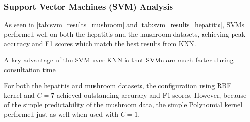 \subsubsection{Support Vector Machines (SVM) Analysis}
\label{subsubsec:discussion-svm}

As seen in \autoref{tab:svm_results_mushroom} and \autoref{tab:svm_results_hepatitis},
SVMs performed well on both the hepatitis and the mushroom datasets,
achieving peak accuracy and F1 scores which match the best results from KNN.

A key advantage of the SVM over KNN is that SVMs are much faster during consultation time

For both the hepatitis and mushroom datasets, the configuration using RBF kernel and $C=7$
achieved outstanding accuracy and F1 scores. However, because of the simple predictability
of the mushroom data, the simple Polynomial kernel performed just as well when used with $C=1$.

